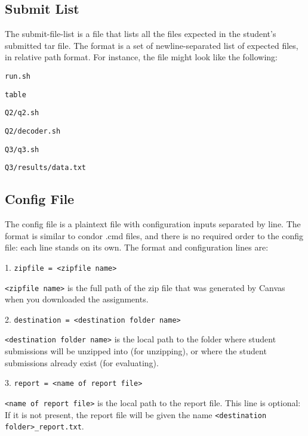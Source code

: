 \documentclass[12pt]{article}
\begin{document}
\subsection{Submit List} \label{sec:submit-list}

The submit-file-list is a file that lists all the files expected in the student's submitted tar file. The format is a set of newline-separated list of expected files, in relative path format. For instance, the file might look like the following:

\vspace{5pt}

\texttt{run.sh}

\texttt{table}

\texttt{Q2/q2.sh}

\texttt{Q2/decoder.sh}

\texttt{Q3/q3.sh}

\texttt{Q3/results/data.txt}

\subsection{Config File} \label{sec:config}

The config file is a plaintext file with configuration inputs separated by line. The format is similar to condor .cmd files, and there is no required order to the config file: each line stands on its own. The format and configuration lines are:

\vspace{5pt}

1. \texttt{zipfile = <zipfile name>}

\texttt{<zipfile name>} is the full path of the zip file that was generated by Canvas when you downloaded the assignments.

\vspace{5pt}

2. \texttt{destination = <destination folder name>}

\texttt{<destination folder name>} is the local path to the folder where student submissions will be unzipped into (for unzipping), or where the student submissions already exist (for evaluating).

\vspace{5pt}

3. \texttt{report = <name of report file>}

\texttt{<name of report file>} is the local path to the report file. This line is optional: If it is not present, the report file will be given the name \texttt{<destination folder>\_report.txt}.
\end{document}
